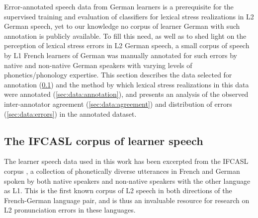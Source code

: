 \documentclass[a4paper]{article}
\newcommand{\TODO}[1]{{\color{red}\textbf{[TODO #1]}}}
\begin{document}
	Error-annotated speech data from German learners is a prerequisite for the supervised training and evaluation of classifiers for  lexical stress realizations in L2 German speech, yet to our knowledge no corpus of learner German with such annotation is publicly available. To fill this need, as well as to shed light on the perception of lexical stress errors in L2 German speech, a small corpus of speech by L1 French learners of German was manually annotated for such errors by native and non-native German speakers with varying levels of phonetics/phonology expertise. This section describes the data selected for annotation (\cref{sec:data:corpus}) and the method by which lexical stress realizations in this data were annotated (\cref{sec:data:annotation}), and presents an analysis of the observed inter-annotator agreement (\cref{sec:data:agreement}) and distribution of errors (\cref{sec:data:errors}) in the annotated dataset.
	
		\subsection{The IFCASL corpus of learner speech}
		\label{sec:data:corpus}		
		
		The learner speech data used in this work has been excerpted from the IFCASL corpus 
		\cite{Fauth2014}, a collection of 
	phonetically diverse utterances in French and German spoken by both native speakers and non-native speakers with the other language as L1. This is the first known corpus of L2 speech in both directions of the French-German language pair, 
	and is thus an invaluable resource for research on 
	L2 pronunciation errors in these languages.
	
\end{document}
